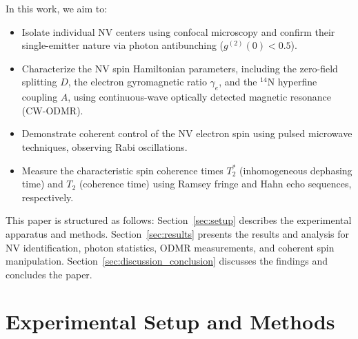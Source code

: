 \documentclass[aps,prb,twocolumn,superscriptaddress,floatfix,longbibliography,citeautoscript]{revtex4-2}
\begin{document}
In this work, we aim to:
\begin{itemize}
    \item Isolate individual NV centers using confocal microscopy and confirm their single-emitter nature via photon antibunching ($g^{(2)}(0) < 0.5$).
    \item Characterize the NV spin Hamiltonian parameters, including the zero-field splitting $D$, the electron gyromagnetic ratio $\gamma_e$, and the $^{14}$N hyperfine coupling $A$, using continuous-wave optically detected magnetic resonance (CW-ODMR).
    \item Demonstrate coherent control of the NV electron spin using pulsed microwave techniques, observing Rabi oscillations.
    \item Measure the characteristic spin coherence times $T_2^*$ (inhomogeneous dephasing time) and $T_2$ (coherence time) using Ramsey fringe and Hahn echo sequences, respectively.
\end{itemize}

This paper is structured as follows: Section~\ref{sec:setup} describes the experimental apparatus and methods. Section~\ref{sec:results} presents the results and analysis for NV identification, photon statistics, ODMR measurements, and coherent spin manipulation. Section~\ref{sec:discussion_conclusion} discusses the findings and concludes the paper.

\section{\label{sec:setup}Experimental Setup and Methods}
\end{document}
